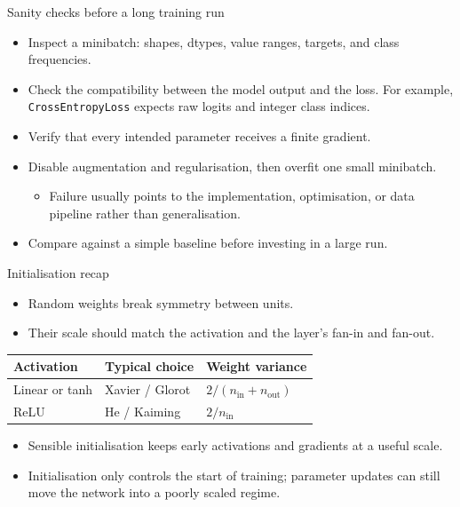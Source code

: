 \begin{frame}{Sanity checks before a long training run}
\begin{itemize}
  \item Inspect a minibatch: shapes, dtypes, value ranges, targets, and class frequencies.
  \item Check the compatibility between the model output and the loss. For example,
  \texttt{CrossEntropyLoss} expects raw logits and integer class indices.
  \item Verify that every intended parameter receives a finite gradient.
  \item Disable augmentation and regularisation, then overfit one small minibatch.
  \begin{itemize}
    \item Failure usually points to the implementation, optimisation, or data pipeline rather than generalisation.
  \end{itemize}
  \item Compare against a simple baseline before investing in a large run.
\end{itemize}
\end{frame}


\begin{frame}{Initialisation recap}
\begin{itemize}
  \item Random weights break symmetry between units.
  \item Their scale should match the activation and the layer's fan-in and fan-out.
\end{itemize}

\begin{center}
\begin{tabular}{lll}
\hline
Activation & Typical choice & Weight variance \\
\hline
Linear or tanh & Xavier / Glorot & $2/(n_{\mathrm{in}}+n_{\mathrm{out}})$ \\
ReLU & He / Kaiming & $2/n_{\mathrm{in}}$ \\
\hline
\end{tabular}
\end{center}

\begin{itemize}
  \item Sensible initialisation keeps early activations and gradients at a useful scale.
  \item Initialisation only controls the start of training; parameter updates can still move the network into a poorly scaled regime.
\end{itemize}
\end{frame}

